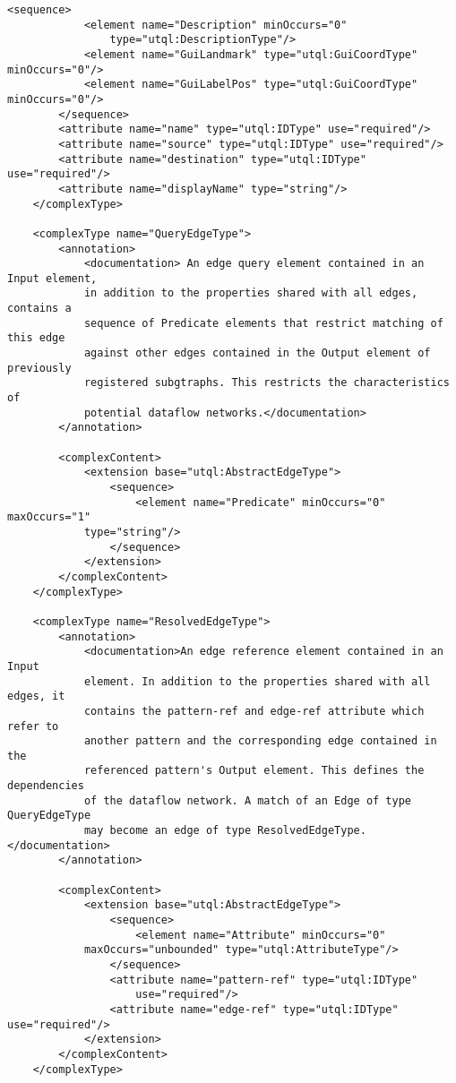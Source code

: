\documentclass[11pt]{article}
\begin{document}
\begin{Verbatim}[fontsize=\footnotesize,tabsize=2]
        <sequence>
            <element name="Description" minOccurs="0"
				type="utql:DescriptionType"/>
			<element name="GuiLandmark" type="utql:GuiCoordType" minOccurs="0"/>
		    <element name="GuiLabelPos" type="utql:GuiCoordType" minOccurs="0"/>
        </sequence>
        <attribute name="name" type="utql:IDType" use="required"/>
        <attribute name="source" type="utql:IDType" use="required"/>
        <attribute name="destination" type="utql:IDType" use="required"/>
        <attribute name="displayName" type="string"/>
    </complexType>
    
    <complexType name="QueryEdgeType">
        <annotation>
            <documentation> An edge query element contained in an Input element,
            in addition to the properties shared with all edges, contains a
            sequence of Predicate elements that restrict matching of this edge
            against other edges contained in the Output element of previously
            registered subgtraphs. This restricts the characteristics of
            potential dataflow networks.</documentation>
        </annotation>
        
        <complexContent>
            <extension base="utql:AbstractEdgeType">
                <sequence>
                    <element name="Predicate" minOccurs="0" maxOccurs="1" 
			type="string"/>
                </sequence>
            </extension>
        </complexContent>
    </complexType>
    
    <complexType name="ResolvedEdgeType">
        <annotation>
            <documentation>An edge reference element contained in an Input
            element. In addition to the properties shared with all edges, it
            contains the pattern-ref and edge-ref attribute which refer to
            another pattern and the corresponding edge contained in the
            referenced pattern's Output element. This defines the dependencies
            of the dataflow network. A match of an Edge of type QueryEdgeType
            may become an edge of type ResolvedEdgeType.</documentation>
        </annotation>
        
        <complexContent>
            <extension base="utql:AbstractEdgeType">
                <sequence>
                    <element name="Attribute" minOccurs="0" 
			maxOccurs="unbounded" type="utql:AttributeType"/>
                </sequence>
                <attribute name="pattern-ref" type="utql:IDType"
					use="required"/>
                <attribute name="edge-ref" type="utql:IDType" use="required"/>
            </extension>
        </complexContent>
    </complexType>
    

\end{Verbatim}
\end{document}
